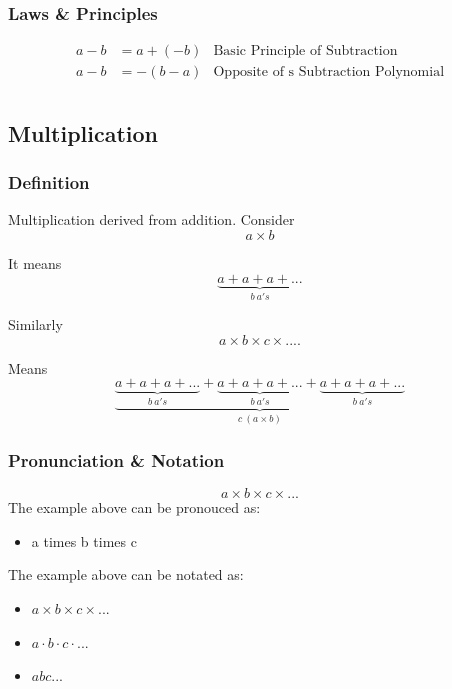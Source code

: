 \documentclass{article}
\begin{document}
    \subsubsection{Laws \& Principles}
    \begin{align*}
        a - b &= a + (-b) &\text{Basic Principle of Subtraction} \\
        a - b &= -(b - a) &\text{Opposite of s Subtraction Polynomial} \\
    \end{align*}

    \subsection{Multiplication}
    \label{section:multiplication}

    \subsubsection{Definition}
    \par
    Multiplication derived from addition. Consider 
    $$ a \times b $$
    \par
    It means 
    $$ \underbrace{a + a + a + ...}_{b\ a's}$$
    \par
    Similarly
    $$ a \times b \times c \times .... $$
    \par
    Means
    $$ \underbrace{\underbrace{a + a + a + ...}_{b\ a's} + \underbrace{a + a + a + ...}_{b\ a's} + \underbrace{a + a + a + ...}_{b\ a's}}_{c\ (a \times b)}$$
    \par

    \subsubsection{Pronunciation \& Notation}
    $$a \times b \times c \times ... $$
    The example above can be pronouced as:
    \begin{itemize}
        \item a times b times c
    \end{itemize}
    The example above can be notated as:
    \begin{itemize}
        \item $a \times b \times c \times ...$
        \item $a \cdot b \cdot c \cdot ...$
        \item $abc...$
    \end{itemize}
\end{document}
